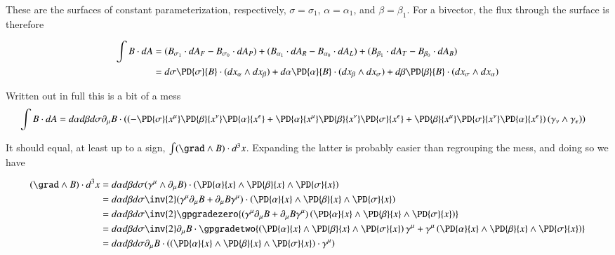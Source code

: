 These are the surfaces of constant parameterization, respectively, $\sigma = \sigma_1$, $\alpha = \alpha_1$, and $\beta = \beta_1$.  For a bivector, the flux through the surface is therefore

\begin{align*}
\int B \cdot dA &= (B_{\sigma_1} \cdot dA_F - B_{\sigma_0} \cdot dA_P ) + (B_{\alpha_1} \cdot dA_R - B_{\alpha_0} \cdot dA_L) + (B_{\beta_1} \cdot dA_T - B_{\beta_0} \cdot dA_B) \\ &= d \sigma \PD{\sigma}{B} \cdot (dx_\alpha \wedge dx_\beta ) + d \alpha \PD{\alpha}{B} \cdot (dx_\beta \wedge dx_\sigma) + d \beta \PD{\beta}{B} \cdot (dx_\sigma \wedge dx_\alpha ) \\
\end{align*}

Written out in full this is a bit of a mess
\begin{align}\label{eqn:mess}
\int B \cdot dA &= d \alpha d\beta d\sigma \partial_\mu B \cdot \left( \left( - \PD{\sigma}{x^\mu} \PD{\beta}{x^\nu} \PD{\alpha}{x^\epsilon} + \PD{\alpha}{x^\mu} \PD{\beta}{x^\nu} \PD{\sigma}{x^\epsilon} + \PD{\beta}{x^\mu} \PD{\sigma}{x^\nu} \PD{\alpha}{x^\epsilon} \right) (\gamma_\nu \wedge \gamma_\epsilon ) \right) 
\end{align}

It should equal, at least up to a sign, $\int (\grad \wedge B) \cdot d^3 x$.  Expanding the latter is probably easier than regrouping the mess, and doing so we have

\begin{align*}
(\grad \wedge B) \cdot d^3 x &= d\alpha d\beta d\sigma ( \gamma^\mu \wedge \partial_\mu B)  \cdot \left( \PD{\alpha}{x} \wedge \PD{\beta}{x} \wedge \PD{\sigma}{x} \right) \\ &= d\alpha d\beta d\sigma \inv{2} ( \gamma^\mu \partial_\mu B + \partial_\mu B \gamma^\mu )  \cdot \left( \PD{\alpha}{x} \wedge \PD{\beta}{x} \wedge \PD{\sigma}{x} \right) \\ &= d\alpha d\beta d\sigma \inv{2} \gpgradezero{ ( \gamma^\mu \partial_\mu B + \partial_\mu B \gamma^\mu )  \left( \PD{\alpha}{x} \wedge \PD{\beta}{x} \wedge \PD{\sigma}{x} \right) } \\ &= d\alpha d\beta d\sigma \inv{2} \partial_\mu B \cdot \gpgradetwo{ \left( \PD{\alpha}{x} \wedge \PD{\beta}{x} \wedge \PD{\sigma}{x} \right) \gamma^\mu + \gamma^\mu \left( \PD{\alpha}{x} \wedge \PD{\beta}{x} \wedge \PD{\sigma}{x} \right) } \\ &= d\alpha d\beta d\sigma \partial_\mu B \cdot \left( \left( \PD{\alpha}{x} \wedge \PD{\beta}{x} \wedge \PD{\sigma}{x} \right) \cdot \gamma^\mu \right) \\
\end{align*}

